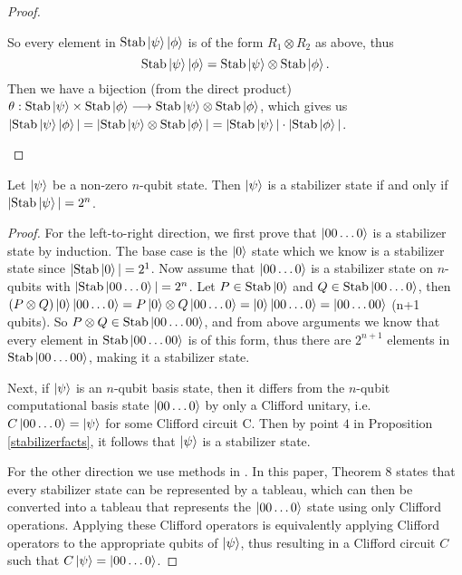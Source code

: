 \documentclass[12pt]{dalthesis}
\begin{document}
\begin{proof}
\begin{enumerate}
 So every element in $\text{Stab}\ket{\psi}\ket{\phi}$ is of the form $R_1 \otimes R_2$ as above, thus 
 \[
 \text{Stab}\ket{\psi}\ket{\phi} = \text{Stab}\ket{\psi} \otimes \text{Stab}\ket{\phi}.
 \]
 Then we have a bijection (from the direct product) $\theta:\text{Stab}\ket{\psi} \times \text{Stab}\ket{\phi} \longrightarrow  \text{Stab}\ket{\psi} \otimes \text{Stab}\ket{\phi}$, which gives us $|\text{Stab}\ket{\psi}\ket{\phi}| = |\text{Stab}\ket{\psi} \otimes \text{Stab}\ket{\phi}| = |\text{Stab}\ket{\psi}| \cdot |\text{Stab}\ket{\phi}|$.
 \qedhere
\end{enumerate}
\end{proof}

\begin{theorem}
Let $\ket{\psi}$ be a non-zero $n$-qubit state. Then $\ket{\psi}$ is a stabilizer state if and only if $|\mathrm{Stab} \ket{\psi}| = 2^n$. 
\end{theorem}
\begin{proof}
For the left-to-right direction, we first prove that $\ket{00 \dots 0}$ is a stabilizer state by induction. The base case is the $\ket{0}$ state which we know is a stabilizer state since $|\text{Stab}\ket{0}| = 2^1$. Now assume that $\ket{00 \dots 0}$ is a stabilizer state on $n$-qubits with $|\text{Stab}\ket{00 \dots 0}| = 2^n$. Let $P \in \text{Stab}\ket{0}$ and $Q \in \text{Stab}\ket{00 \dots 0}$, then $(P \otimes Q)\ket{0}\ket{00 \dots 0} = P\ket{0} \otimes Q\ket{00 \dots 0} = \ket{0}\ket{00 \dots 0} = \ket{00 \dots 00}$ (n+1 qubits). So $P \otimes Q \in \text{Stab}\ket{00 \dots 00}$, and from above arguments we know that every element in $\text{Stab}\ket{00 \dots 00}$ is of this form, thus there are $2^{n+1}$ elements in $\text{Stab}\ket{00 \dots 00}$, making it a stabilizer state.

Next, if $\ket{\psi}$ is an $n$-qubit basis state, then it differs from the $n$-qubit computational basis state $\ket{00 \ldots 0}$ by only a Clifford unitary, i.e. $C\ket{00 \ldots 0} = \ket{\psi}$ for some Clifford circuit C. Then by point $4$ in Proposition \ref{stabilizerfacts}, it follows that $\ket{\psi}$ is a stabilizer state.

For the other direction we use methods in \cite{Aaronson_2004}. In this paper,  Theorem 8 states that every stabilizer state can be represented by a tableau, which can then be converted into a tableau that represents the $\ket{00 \dots 0}$ state using only Clifford operations. Applying these Clifford operators is equivalently applying Clifford operators to the appropriate qubits of $\ket{\psi}$, thus resulting in a Clifford circuit $C$ such that $C\ket{\psi} = \ket{00 \dots 0}$. 
\end{proof}
\end{document}
